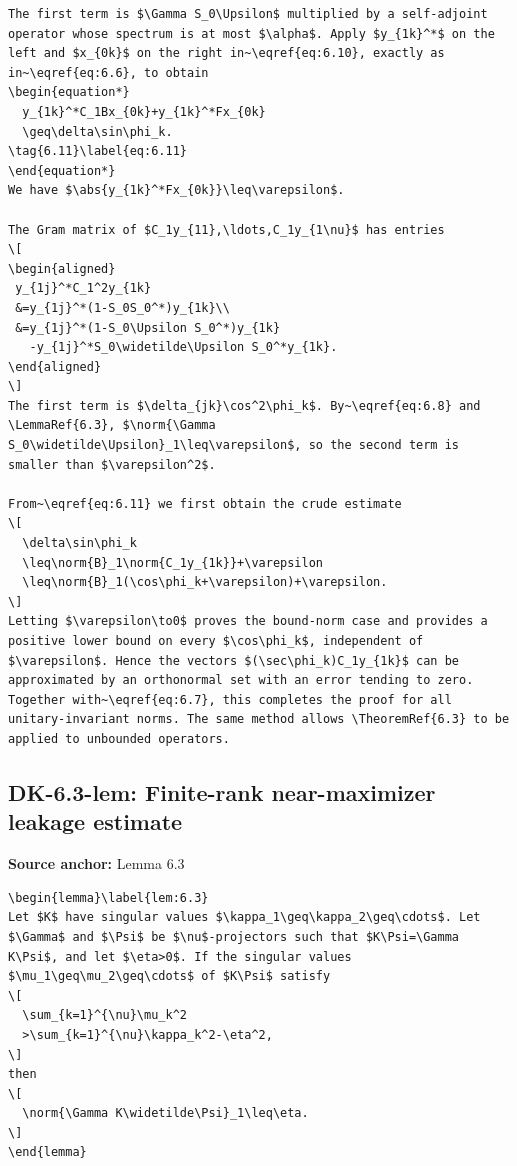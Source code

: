 \begin{verbatim}
The first term is $\Gamma S_0\Upsilon$ multiplied by a self-adjoint operator whose spectrum is at most $\alpha$. Apply $y_{1k}^*$ on the left and $x_{0k}$ on the right in~\eqref{eq:6.10}, exactly as in~\eqref{eq:6.6}, to obtain
\begin{equation*}
  y_{1k}^*C_1Bx_{0k}+y_{1k}^*Fx_{0k}
  \geq\delta\sin\phi_k.
\tag{6.11}\label{eq:6.11}
\end{equation*}
We have $\abs{y_{1k}^*Fx_{0k}}\leq\varepsilon$.

The Gram matrix of $C_1y_{11},\ldots,C_1y_{1\nu}$ has entries
\[
\begin{aligned}
 y_{1j}^*C_1^2y_{1k}
 &=y_{1j}^*(1-S_0S_0^*)y_{1k}\\
 &=y_{1j}^*(1-S_0\Upsilon S_0^*)y_{1k}
   -y_{1j}^*S_0\widetilde\Upsilon S_0^*y_{1k}.
\end{aligned}
\]
The first term is $\delta_{jk}\cos^2\phi_k$. By~\eqref{eq:6.8} and \LemmaRef{6.3}, $\norm{\Gamma S_0\widetilde\Upsilon}_1\leq\varepsilon$, so the second term is smaller than $\varepsilon^2$.

From~\eqref{eq:6.11} we first obtain the crude estimate
\[
  \delta\sin\phi_k
  \leq\norm{B}_1\norm{C_1y_{1k}}+\varepsilon
  \leq\norm{B}_1(\cos\phi_k+\varepsilon)+\varepsilon.
\]
Letting $\varepsilon\to0$ proves the bound-norm case and provides a positive lower bound on every $\cos\phi_k$, independent of $\varepsilon$. Hence the vectors $(\sec\phi_k)C_1y_{1k}$ can be approximated by an orthonormal set with an error tending to zero. Together with~\eqref{eq:6.7}, this completes the proof for all unitary-invariant norms. The same method allows \TheoremRef{6.3} to be applied to unbounded operators.
\end{verbatim}

\subsection*{DK-6.3-lem: Finite-rank near-maximizer leakage estimate}
\noindent\textbf{Source anchor:} Lemma 6.3\\
\begin{verbatim}
\begin{lemma}\label{lem:6.3}
Let $K$ have singular values $\kappa_1\geq\kappa_2\geq\cdots$. Let $\Gamma$ and $\Psi$ be $\nu$-projectors such that $K\Psi=\Gamma K\Psi$, and let $\eta>0$. If the singular values $\mu_1\geq\mu_2\geq\cdots$ of $K\Psi$ satisfy
\[
  \sum_{k=1}^{\nu}\mu_k^2
  >\sum_{k=1}^{\nu}\kappa_k^2-\eta^2,
\]
then
\[
  \norm{\Gamma K\widetilde\Psi}_1\leq\eta.
\]
\end{lemma}
\end{verbatim}

